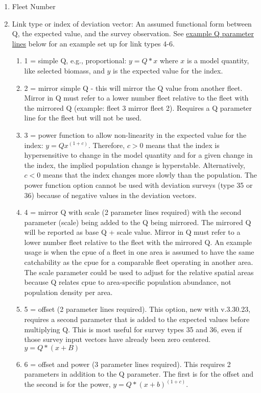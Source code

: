 \begin{enumerate}
	\item Fleet Number
	\item Link type or index of deviation vector: An assumed functional form between Q, the expected value, and the survey observation. See \hyperlink{QParams}{example Q parameter lines} below for an example set up for link types 4-6.
	\begin{enumerate}[label=(\alph*)]
		\item 1 = simple Q, e.g., proportional: $y=Q*x$ where $x$ is a model quantity, like selected biomass, and $y$ is the expected value for the index.
		\item 2 = mirror simple Q - this will mirror the Q value from another fleet. Mirror in Q must refer to a lower number fleet relative to the fleet with the mirrored Q (example: fleet 3 mirror fleet 2). Requires a Q parameter line for the fleet but will not be used.
		\item 3 = power function to allow non-linearity in the expected value for the index: $y=Qx^{(1+c)}$. Therefore, $c > 0$ means that the index is hypersensitive to change in the model quantity and for a given change in the index, the implied population change is hyperstable. Alternatively, $c < 0$ means that the index changes more slowly than the population. The power function option cannot be used with deviation surveys (type 35 or 36) because of negative values in the deviation vectors.
		\item 4 = mirror Q with scale (2 parameter lines required) with the second parameter (scale) being added to the Q being mirrored. The mirrored Q will be reported as base Q + scale value. Mirror in Q must refer to a lower number fleet relative to the fleet with the mirrored Q. An example usage is when the \gls{cpue} of a fleet in one area is assumed to have the same catchability as the \gls{cpue} for a comparable fleet operating in another area. The scale parameter could be used to adjust for the relative spatial areas because Q relates \gls{cpue} to area-specific population abundance, not population density per area.
		\item 5 = offset (2 parameter lines required). This option, new with v.3.30.23, requires a second parameter that is added to the expected values before multiplying Q. This is most useful for survey types 35 and 36, even if those survey input vectors have already been zero centered. $y=Q*(x+B)$
		\item 6 = offset and power (3 parameter lines required). This requires 2 parameters in addition to the Q parameter. The first is for the offset and the second is for the power, $y=Q*(x+b)^{(1+c)}$.

\end{enumerate}
\end{enumerate}
